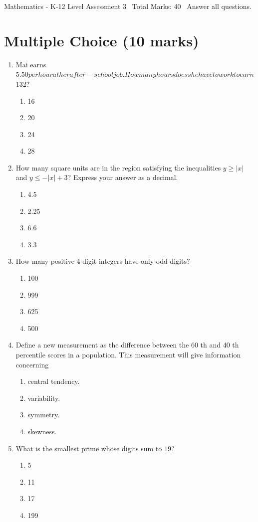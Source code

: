 \documentclass[12pt]{article}
\begin{document}
\begin{center}
Mathematics - K-12 Level Assessment 3 \
Total Marks: 40 \
Answer all questions.
\end{center}

\section*{Multiple Choice (10 marks)}
\begin{enumerate}[label=\arabic*.]
\item Mai earns $5.50 per hour at her after-school job. How many hours does she have to work to earn $132?
\begin{enumerate}[label=(\alph*)]
    \item 16
    \item 20
    \item 24
    \item 28
\end{enumerate}
\item How many square units are in the region satisfying the inequalities $y \ge |x|$ and $y \le -|x|+3$? Express your answer as a decimal.
\begin{enumerate}[label=(\alph*)]
    \item 4.5
    \item 2.25
    \item 6.6
    \item 3.3
\end{enumerate}
\item How many positive 4-digit integers have only odd digits?
\begin{enumerate}[label=(\alph*)]
    \item 100
    \item 999
    \item 625
    \item 500
\end{enumerate}
\item Define a new measurement as the difference between the 60 th and 40 th percentile scores in a population. This measurement will give information concerning
\begin{enumerate}[label=(\alph*)]
    \item central tendency.
    \item variability.
    \item symmetry.
    \item skewness.
\end{enumerate}
\item What is the smallest prime whose digits sum to $19$?
\begin{enumerate}[label=(\alph*)]
    \item 5
    \item 11
    \item 17
    \item 199
\end{enumerate}
\end{enumerate}
\end{document}

